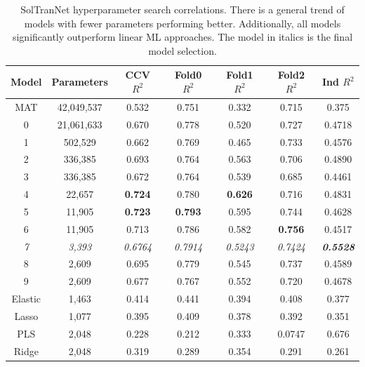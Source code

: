 \documentclass[journal=jcisd8,manuscript=article]{achemso}
\begin{document}
\begin{table}
    \begin{tabular}{|c|c|c|c|c|c|c|}
        \hline
         Model & Parameters & CCV $R^2$ & Fold0 $R^2$ & Fold1 $R^2$ & Fold2 $R^2$ & Ind $R^2$ \\
         \hline
         MAT & 42,049,537 & 0.532 & 0.751 & 0.332 & 0.715 & 0.375  \\
         \hline
         0 & 21,061,633 & 0.670 & 0.778 & 0.520 & 0.727 & 0.4718 \\
         1 & 502,529 & 0.662 & 0.769 & 0.465 & 0.733 & 0.4576 \\
         2 & 336,385 & 0.693 & 0.764 & 0.563 & 0.706 & 0.4890 \\
         3 & 336,385 & 0.672 & 0.764 & 0.539 & 0.685 & 0.4461 \\
         4 & 22,657 & \textbf{0.724} & 0.780 & \textbf{0.626} & 0.716 & 0.4831 \\
         5 & 11,905 & \textbf{0.723} & \textbf{0.793} & 0.595 & 0.744 & 0.4628 \\
         6 & 11,905 & 0.713 & 0.786 & 0.582 & \textbf{0.756} & 0.4517 \\
         \emph{7} & \emph{3,393} & \emph{0.6764} & \emph{0.7914} & \emph{0.5243} & \emph{0.7424} & \emph{\textbf{0.5528}}\\
         8 & 2,609 & 0.695 & 0.779 & 0.545 & 0.737  & 0.4589\\
         9 & 2,609 & 0.677 & 0.767 & 0.552 & 0.720  & 0.4678\\
         \hline
         Elastic & 1,463 & 0.414 & 0.441 & 0.394 & 0.408  & 0.377\\
         Lasso & 1,077 & 0.395 & 0.409 & 0.378 & 0.392  & 0.351\\
         PLS & 2,048 & 0.228 & 0.212 & 0.333 & 0.0747  & 0.676\\
         Ridge & 2,048 & 0.319 & 0.289 & 0.354 & 0.291 & 0.261 \\
         \hline
    \end{tabular}
    \caption{SolTranNet hyperparameter search correlations. There is a general trend of models with fewer parameters performing better. Additionally, all models significantly outperform linear ML approaches. The model in italics is the final model selection.}
    \label{tab:solsearchr2}
\end{table}
\end{document}
